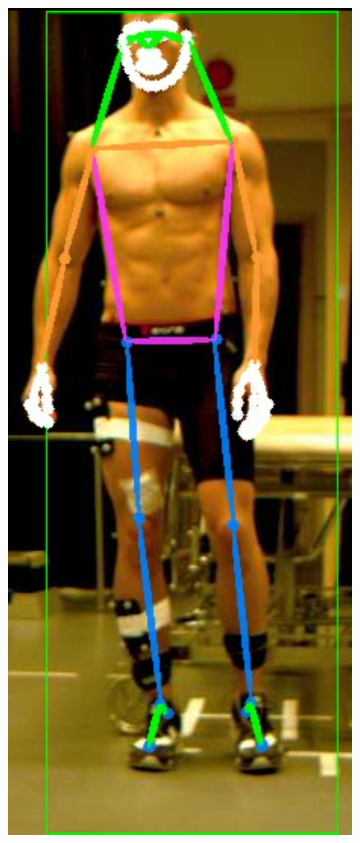 {\addtolength{\textfloatsep}{-0.2in}
\begin{figure}[h]
  \centering
  \begin{subfigure}[t]{0.22\textwidth}
    \centering
    \includegraphics[height=1.3\textwidth]{files/figs/res/hpe/36-1.png}
    \caption{}
  \end{subfigure}
  ~
  \begin{subfigure}[t]{0.22\textwidth}
    \centering

\end{subfigure}
\end{figure}}
